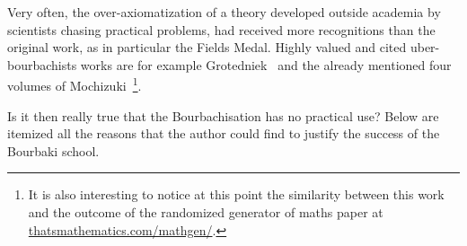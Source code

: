 \documentclass[]{scrartcl}
\theoremstyle{definition}
\begin{document}
Very often, the over-axiomatization of a theory developed outside academia by scientists chasing practical problems, had received more recognitions than the original work, as in particular the Fields Medal.
Highly valued and cited uber-bourbachists works are for example Grotedniek~\cite{grothendieck2011some} and the already mentioned four volumes of Mochizuki~\cite{mochizuki2012inter}\footnote{
    It is also interesting to notice at this point the similarity between this work and the outcome of the randomized generator of maths paper at \href{https://thatsmathematics.com/mathgen/}{thatsmathematics.com/mathgen/}.
}.


Is it then really true that the Bourbachisation has no practical use? Below are itemized all the reasons that the author could find to justify the success of the Bourbaki school.
\end{document}

